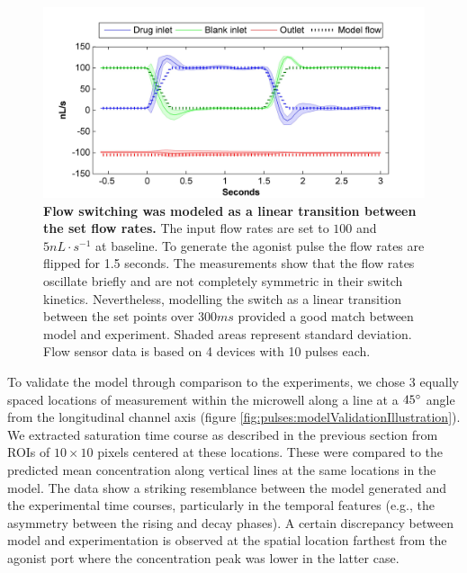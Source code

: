   \begin{figure}[!htb]
       \centering
       \includegraphics[width=15cm]{chapter6/figures/flowPulse/flowPulse.jpg}
       \caption[Measured and model flow rate switches during an agonist pulse]{\textbf{Flow switching was modeled as a linear transition between the set flow rates.} The input flow rates are set to \(100\) and \(5 nL\cdot s^{-1}\) at baseline. To generate the agonist pulse the flow rates are flipped for 1.5 seconds. The measurements show that the flow rates oscillate briefly and are not completely symmetric in their switch kinetics. Nevertheless, modelling the switch as a linear transition between the set points over \(300ms\) provided a good match between model and experiment. Shaded areas represent standard deviation. Flow sensor data is based on 4 devices with 10 pulses each.}
       \label{fig:pulses:flowPulse}
  \end{figure}

To validate the model through comparison to the experiments, we chose 3 equally spaced locations of measurement within the microwell along a line at a \(45\degree\) angle from the longitudinal channel axis (figure \ref{fig:pulses:modelValidationIllustration}). We extracted saturation time course as described in the previous section from ROIs of \(10\times 10\) pixels centered at these locations. These were compared to the predicted mean concentration along vertical lines at the same locations in the model. The data show a striking resemblance between the model generated and the experimental time courses, particularly in the temporal features (e.g., the asymmetry between the rising and decay phases). A certain discrepancy between model and experimentation is observed at the spatial location farthest from the agonist port where the concentration peak was lower in the latter case.


